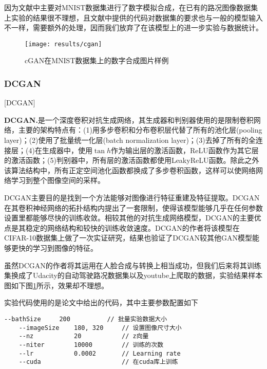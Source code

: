 因为文献中\cite{cGAN}主要对MNIST\cite{mnist}数据集进行了数字模拟合成，在已有的路况图像数据集上实验的结果很不理想，且文献中提供的代码对数据集的要求也与一般的模型输入不一样，需要额外的处理，因而我们放弃了在该模型上的进一步实验与数据统计。 

\begin{figure}[h]
    \centering
    \texttt{[image: results/cgan]}
    \caption{cGAN在MNIST数据集上的数字合成图片样例}
\end{figure}

\subsubsection{DCGAN}[DCGAN]

\textbf{DCGAN.}\cite{dcgan}\quad 是一个深度卷积对抗生成网络，其生成器和判别器使用的是限制卷积网络，主要的架构特点有：(1)用多步卷积和分布卷积层代替了所有的池化层(pooling layer)；(2)使用了批量统一化层(batch normalization layer)；(3)去掉了所有的全连接层；(4)在生成器中，使用$\tan{h}$作为输出层的激活函数，ReLU函数作为其它层的激活函数；(5)判别器中，所有层的激活函数都使用LeakyReLU函数。除此之外该算法结构中，所有正定空间池化函数都换成了多步卷积函数，这样可以使网络网络学习到整个图像空间的采样。

DCGAN主要目的是找到一个方法能够对图像进行特征重建及特征提取。DCGAN在其卷积神经网络的拓扑结构内提出了一套限制，使得该模型能够几乎在任何参数设置里都能够尽快的训练收敛。相较其他的对抗生成网络模型，DCGAN的主要优点是其稳定的网络结构和较快的训练收敛速度。DCGAN的作者将该模型在CIFAR-10\cite{cifar10}数据集上做了一次实证研究，结果也验证了DCGAN较其他GAN模型能够更快的学习到图像的特征。

虽然DCGAN的作者将其运用在人脸合成与转换上相当成功，但我们后来将其训练集换成了Udacity的自动驾驶路况数据集以及youtube上爬取的数据，实验结果样本图如下图\ref{dcgan_example}所示，效果却不理想。

\begin{figure}[h]
    \centering
    \caption{}
    \label{dcgan_example}
\end{figure}

实验代码使用的是\cite{dcgan}论文中给出的代码，其中主要参数配置如下

\begin{lstlisting}[basicstyle=\small]
    --bathSize     200          // 批量实验数据大小
    --imageSize    180, 320     // 设置图像尺寸大小
    --nz           20           // z向量
    --niter        10000        // 训练的次数
    --lr           0.0002       // Learning rate
    --cuda                      // 在cuda库上训练
\end{lstlisting}

